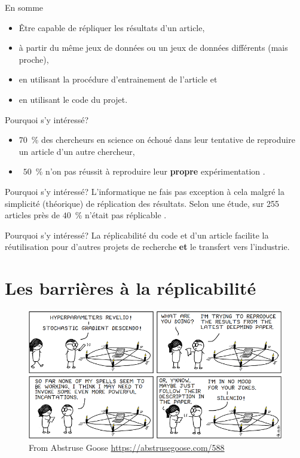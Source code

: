 \documentclass{beamer}
\begin{document}
	\begin{frame}{En somme}
		\begin{itemize}
			\item Être capable de répliquer les résultats d'un article,
			\item à partir du même jeux de données ou un jeux de données différents (mais proche),
			\item en utilisant la procédure d'entrainement de l'article et
			\item en utilisant le code du projet.
		\end{itemize}
	\end{frame}

	\begin{frame}{Pourquoi s'y intéressé?}
		\begin{itemize}
			\item $70$~\% des chercheurs en science on échoué dans leur tentative de reproduire un article d'un autre chercheur,
			\item ~$50$~\% n'on pas réussit à reproduire leur \textbf{propre} expérimentation \cite{baker500ScientistsLift2016}.
		\end{itemize}
	\end{frame}

	\begin{frame}{Pourquoi s'y intéressé?}
		L'informatique ne fais pas exception à cela malgré la simplicité (théorique) de réplication des résultats. Selon une étude, sur 255 articles près de $40$~\% n'était pas réplicable \cite{raff2019step}.
	\end{frame}

	\begin{frame}{Pourquoi s'y intéressé?}
		La réplicabilité du code et d'un article facilite la réutilisation pour d'autres projets de recherche \textbf{et} le transfert vers l'industrie. 
	\end{frame}
	
	\section{Les barrières à la réplicabilité}
		\begin{frame}
			\begin{figure}
				\includegraphics[scale=0.5]{muggle_problems.png}
				\caption{From Abstruse Goose \url{https://abstrusegoose.com/588}}
			\end{figure}
		\end{frame}
	
\end{document}
